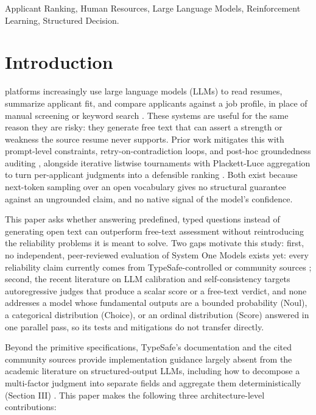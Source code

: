 \documentclass[journal]{IEEEtran}
\begin{document}
\begin{IEEEkeywords}
Applicant Ranking, Human Resources, Large Language Models, Reinforcement Learning, Structured Decision.
\end{IEEEkeywords}

\IEEEpeerreviewmaketitle

\section{Introduction}
 platforms increasingly use large language models (LLMs) to read resumes, summarize applicant fit, and compare applicants against a job profile, in place of manual screening or keyword search \cite{ref1,ref2,ref3,ref4}. These systems are useful for the same reason they are risky: they generate free text that can assert a strength or weakness the source resume never supports. Prior work mitigates this with prompt-level constraints, retry-on-contradiction loops, and post-hoc groundedness auditing \cite{ref2}, alongside iterative listwise tournaments with Plackett-Luce aggregation to turn per-applicant judgments into a defensible ranking \cite{ref1,ref2}. Both exist because next-token sampling over an open vocabulary gives no structural guarantee against an ungrounded claim, and no native signal of the model's confidence.

This paper asks whether answering predefined, typed questions instead of generating open text can outperform free-text assessment without reintroducing the reliability problems it is meant to solve. Two gaps motivate this study: first, no independent, peer-reviewed evaluation of System One Models exists yet: every reliability claim currently comes from TypeSafe-controlled or community sources \cite{ref5,ref6,ref7,ref8,ref9}; second, the recent literature on LLM calibration and self-consistency \cite{ref10,ref11,ref12,ref13} targets autoregressive judges that produce a scalar score or a free-text verdict, and none addresses a model whose fundamental outputs are a bounded probability (Noul), a categorical distribution (Choice), or an ordinal distribution (Score) answered in one parallel pass, so its tests and mitigations do not transfer directly.

Beyond the primitive specifications, TypeSafe's documentation and the cited community sources provide implementation guidance largely absent from the academic literature on structured-output LLMs, including how to decompose a multi-factor judgment into separate fields and aggregate them deterministically (Section III) \cite{ref6,ref7}.
This paper makes the following three architecture-level contributions:
\end{document}
